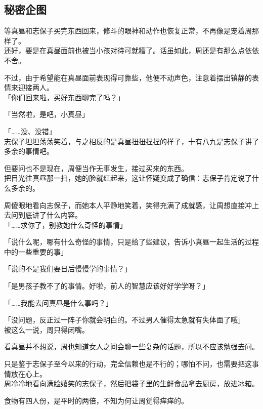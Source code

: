 \subsection{秘密企图}

等真昼和志保子买完东西回来，修斗的眼神和动作也恢复正常，不再像是宠着周那样了。\\

还好，要是在真昼面前也被当小孩对待可就糟了。话虽如此，周还是有那么点依依不舍。

不过，由于希望能在真昼面前表现得可靠些，他便不动声色，注意着摆出镇静的表情来迎接两人。\\

「你们回来啦，买好东西聊完了吗？」

「当然啦，是吧，小真昼」

「……没、没错」\\

志保子坦坦荡荡笑着，与之相反的是真昼扭扭捏捏的样子，十有八九是志保子讲了多余的事情吧。

但要问也不是现在，周便当作无事发生，接过买来的东西。\\

把目光往真昼那一扫，她的脸就红起来，这让怀疑变成了确信：志保子肯定说了什么多余的。

周傻眼地看向志保子，而她本人平静地笑着，笑得充满了成就感，让周想直接冲上去问到底讲了什么内容。\\

「……求你了，别教她什么奇怪的事情」

「说什么呢，哪有什么奇怪的事情，只是给了些建议，告诉小真昼一起生活的过程中的一些重要的事」

「说的不是我们要日后慢慢学的事情？」

「是男孩子教不了的事情。好啦，前人的智慧应该好好学学呀？」

「……我能去问真昼是什么事吗？」

「没问题，反正过一阵子你就会明白的。不过男人催得太急就有失体面了哦」\\

被这么一说，周只得闭嘴。

看真昼并不想说，周也知道女人之间会聊一些复杂的话题，所以不应该勉强去问。

只是鉴于志保子至今以来的行动，完全信赖也是不行的；哪怕不问，也需要把这事情放在心上。\\

周冷冷地看向满脸嬉笑的志保子，然后把袋子里的生鲜食品拿去厨房，放进冰箱。

食物有四人份，是平时的两倍，不知为何让周觉得痒痒的。\\

